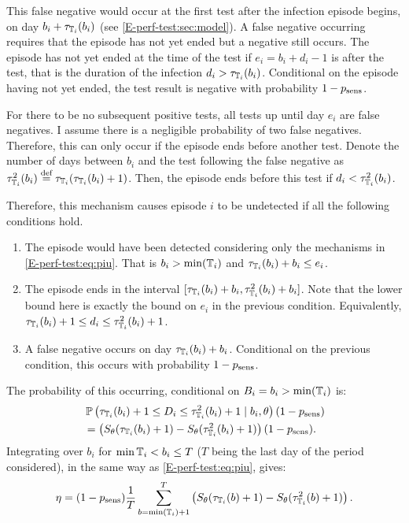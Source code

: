 \documentclass[thesis.tex]{subfiles}
\begin{document}
This false negative would occur at the first test after the infection episode begins, on day $b_i + \tau_{\mathbb{T}_i}(b_i)$ (see \cref{E-perf-test:sec:model}).
A false negative occurring requires that the episode has not yet ended but a negative still occurs.
The episode has not yet ended at the time of the test if $e_i = b_i + d_i - 1$ is after the test, that is the duration of the infection $d_i > \tau_{\mathbb{T}_i}(b_i)$.
Conditional on the episode having not yet ended, the test result is negative with probability $1 - p_\text{sens}$.

For there to be no subsequent positive tests, all tests up until day $e_i$ are false negatives.
I assume there is a negligible probability of two false negatives.
Therefore, this can only occur if the episode ends before another test.
Denote the number of days between $b_i$ and the test following the false negative as $\tau^2_{\mathbb{T}_i}(b_i) \stackrel{\text{def}}{=} \tau_{\mathbb{T}_i}(\tau_{\mathbb{T}_i}(b_i) + 1)$.
Then, the episode ends before this test if $d_i < \tau^2_{\mathbb{T}_i}(b_i)$.

Therefore, this mechanism causes episode $i$ to be undetected if all the following conditions hold.
\begin{enumerate}
    \item The episode would have been detected considering only the mechanisms in \cref{E-perf-test:eq:piu}. That is $b_i > \min(\mathbb{T}_i)$ and $\tau_{\mathbb{T}_i}(b_i) + b_i \leq e_i$.
    \item The episode ends in the interval $[\tau_{\mathbb{T}_i}(b_i) + b_i, \tau^2_{\mathbb{T}_i}(b_i) + b_i]$.
      Note that the lower bound here is exactly the bound on $e_i$ in the previous condition.
      Equivalently, $\tau_{\mathbb{T}_i}(b_i) + 1 \leq d_i \leq \tau^2_{\mathbb{T}_i}(b_i) + 1$.
    \item A false negative occurs on day $\tau_{\mathbb{T}_i}(b_i) + b_i$. Conditional on the previous condition, this occurs with probability $1 - p_\text{sens}$.
\end{enumerate}

The probability of this occurring, conditional on $B_i = b_i > \min(\mathbb{T}_i)$ is:
\begin{align}
&\operatorname{\mathbb{P}} \left(
    \tau_{\mathbb{T}_i}(b_i) + 1 \leq D_i \leq \tau^2_{\mathbb{T}_i}(b_i) + 1
    \mid b_i,
\theta \right) (1 - p_\text{sens}) \\
&= \left( S_\theta(\tau_{\mathbb{T}_i}(b_i) + 1) - S_\theta(\tau^2_{\mathbb{T}_i}(b_i) + 1) \right) (1 - p_\text{sens}).
\end{align}
Integrating over $b_i$ for $\min \mathbb{T}_i < b_i \leq T$ ($T$ being the last day of the period considered), in the same way as \cref{E-perf-test:eq:piu}, gives:
\begin{align}
\eta = (1 - p_\text{sens})\frac{1}{T} \sum_{b=\min(\mathbb{T}_i) + 1}^T \left( S_\theta(\tau_{\mathbb{T}_i}(b) + 1) - S_\theta(\tau^2_{\mathbb{T}_i}(b) + 1) \right).
\end{align}
\end{document}
